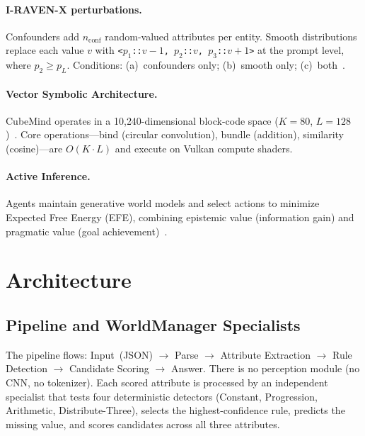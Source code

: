 \documentclass{article}
\begin{document}
\paragraph{I-RAVEN-X perturbations.}
Confounders add $n_\text{conf}$ random-valued attributes per entity. Smooth distributions replace each value $v$ with \texttt{<$p_1$::$v{-}1$, $p_2$::$v$, $p_3$::$v{+}1$>} at the prompt level, where $p_2 \geq p_L$. Conditions: (a)~confounders only; (b)~smooth only; (c)~both~\cite{sicking2026iravenx}.

\paragraph{Vector Symbolic Architecture.}
CubeMind operates in a 10{,}240-dimensional block-code space ($K{=}80$, $L{=}128$)~\cite{hersche2023nvsa}. Core operations---bind (circular convolution), bundle (addition), similarity (cosine)---are $O(K {\cdot} L)$ and execute on Vulkan compute shaders.

\paragraph{Active Inference.}
Agents maintain generative world models and select actions to minimize Expected Free Energy (EFE), combining epistemic value (information gain) and pragmatic value (goal achievement)~\cite{friston2010free,namjoshi2026active}.

\section{Architecture}

\subsection{Pipeline and WorldManager Specialists}

The pipeline flows: Input~(JSON) $\rightarrow$ Parse $\rightarrow$ Attribute Extraction $\rightarrow$ Rule Detection $\rightarrow$ Candidate Scoring $\rightarrow$ Answer. There is no perception module (no CNN, no tokenizer). Each scored attribute is processed by an independent specialist that tests four deterministic detectors (Constant, Progression, Arithmetic, Distribute-Three), selects the highest-confidence rule, predicts the missing value, and scores candidates across all three attributes.
\end{document}

